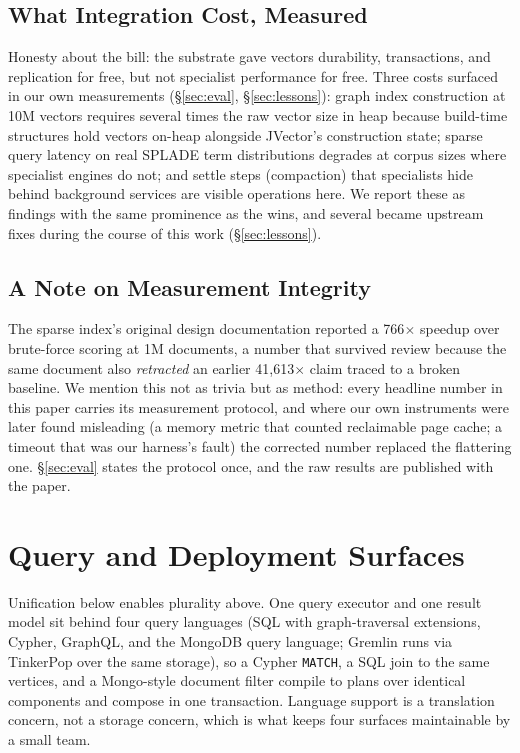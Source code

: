 \documentclass[conference]{IEEEtran}
\begin{document}
\subsection{What Integration Cost, Measured}

Honesty about the bill: the substrate gave vectors durability, transactions,
and replication for free, but not specialist performance for free. Three
costs surfaced in our own measurements (\S\ref{sec:eval},
\S\ref{sec:lessons}): graph index construction at 10M vectors requires several
times the raw vector size in heap because build-time structures hold vectors
on-heap alongside JVector's construction state; sparse query latency on real
SPLADE term distributions degrades at corpus sizes where specialist engines
do not; and settle steps (compaction) that specialists hide behind background
services are visible operations here. We report these as findings with the
same prominence as the wins, and several became upstream fixes during the
course of this work (\S\ref{sec:lessons}).

\subsection{A Note on Measurement Integrity}

The sparse index's original design documentation reported a 766$\times$
speedup over brute-force scoring at 1M documents, a number that survived
review because the same document also \emph{retracted} an earlier
41{,}613$\times$ claim traced to a broken baseline. We mention this not as
trivia but as method: every headline number in this paper carries its
measurement protocol, and where our own instruments were later found
misleading (a memory metric that counted reclaimable page cache; a timeout
that was our harness's fault) the corrected number replaced the flattering
one. \S\ref{sec:eval} states the protocol once, and the raw results are
published with the paper.

\section{Query and Deployment Surfaces}\label{sec:surfaces}

Unification below enables plurality above. One query executor and one result
model sit behind four query languages (SQL with graph-traversal extensions,
Cypher, GraphQL, and the MongoDB query language; Gremlin runs via TinkerPop
over the same storage), so a Cypher \texttt{MATCH}, a SQL join to the same
vertices, and a Mongo-style document filter compile to plans over identical
components and compose in one transaction. Language support is a translation
concern, not a storage concern, which is what keeps four surfaces
maintainable by a small team.
\end{document}
